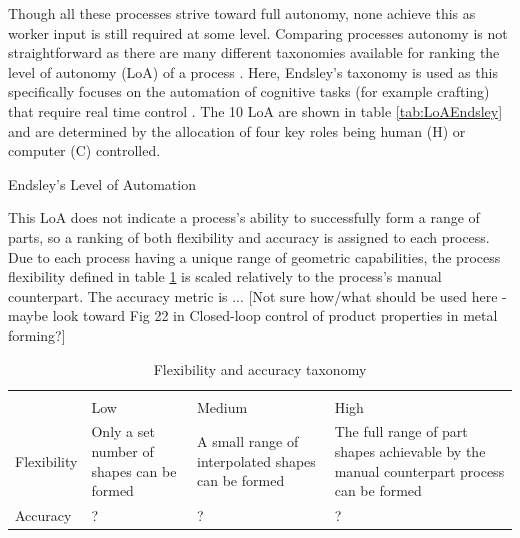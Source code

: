 Though all these processes strive toward full autonomy, none achieve this as worker input is still required at some level. Comparing processes autonomy is not straightforward as there are many different taxonomies available for ranking the level of autonomy (LoA) of a process \citep{Vagia2015AProposed, Frohm2008LevelsManufacturing}. Here,  Endsley's taxonomy is used \citep{Endsley1999LevelTask} as this specifically focuses on the automation of cognitive tasks (for example crafting) that require real time control \citep{Vagia2015AProposed}. The 10 LoA are shown in table \ref{tab:LoAEndsley}  and are determined by the allocation of four key roles being human (H) or computer (C) controlled.

\begin{table}[h] 
    \centering
        
    \caption{Endsley's Level of Automation \citep{Endsley1999LevelTask}}
    \label{tab:LoAEndsley}
\end{table}

This LoA does not indicate a process's ability to successfully form a range of parts, so a ranking of both flexibility and accuracy is assigned to each process. Due to each process having a unique range of geometric capabilities, the process flexibility defined in table \ref{tab:flexandaccuracy} is scaled relatively to the process's manual counterpart. 
The accuracy metric is ... [Not sure how/what should be used here - maybe look toward Fig 22 in Closed-loop control of product properties in metal forming?]




\begin{table}[h] 
    \centering
\begin{tabular}{p{}>{\centering}p{}>{\centering}p{}>{\centering\arraybackslash}p{}} \toprule
            & \multicolumn{3}{c}{Rank}                                                                                                                                                                  \\
\cmidrule(lr){2-4}
            & Low                                       & Medium                                             & High                                                                                     \\
\cmidrule(lr){1-4}
Flexibility & Only a set number of shapes can be formed & A small range of interpolated shapes can be formed & The full range of part shapes achievable by the manual counterpart process can be formed \\
Accuracy    &   ?                                        & ?                                                    & ?                                                                                         \\
\bottomrule
\end{tabular}
    \caption{Flexibility and accuracy taxonomy}
    \label{tab:flexandaccuracy}
\end{table}


